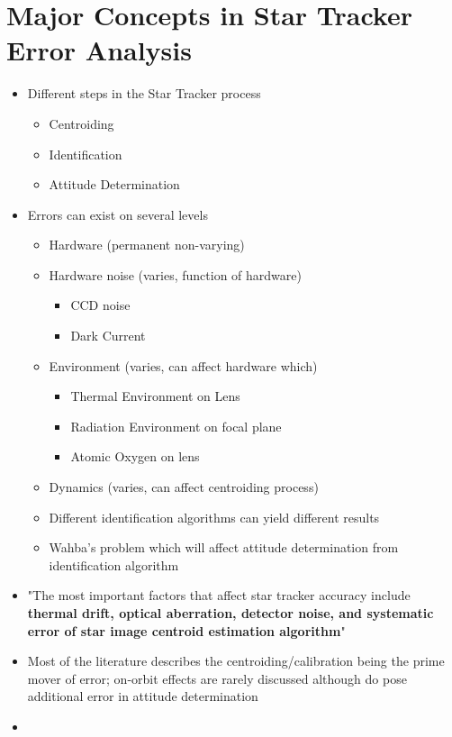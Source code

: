 \chapter{Major Concepts in Star Tracker Error Analysis}
\begin{itemize}
    \item Different steps in the Star Tracker process
    \begin{itemize}
        \item Centroiding
        \item Identification
        \item Attitude Determination
    \end{itemize}
    \item Errors can exist on several levels
    \begin{itemize}
        \item Hardware (permanent non-varying)
        \item Hardware noise (varies, function of hardware)
        \begin{itemize}
            \item CCD noise 
            \item Dark Current 
        \end{itemize}
        \item Environment (varies, can affect hardware which)
        \begin{itemize}
            \item Thermal Environment on Lens
            \item Radiation Environment on focal plane 
            \item Atomic Oxygen on lens 
        \end{itemize}
        \item Dynamics (varies, can affect centroiding process)
        \item Different identification algorithms can yield different results
        \item Wahba's problem which will affect attitude determination from identification algorithm
    \end{itemize}
    \item "The most important factors that affect star tracker accuracy include \textbf{thermal drift, optical aberration, detector noise, and systematic error of star image centroid estimation algorithm}"\cite{systematic_error_analysis_of_star_tracker_centroiding}
    \item Most of the literature describes the centroiding/calibration being the prime mover of error; on-orbit effects are rarely discussed although do pose additional error in attitude determination
    \item 
\end{itemize}